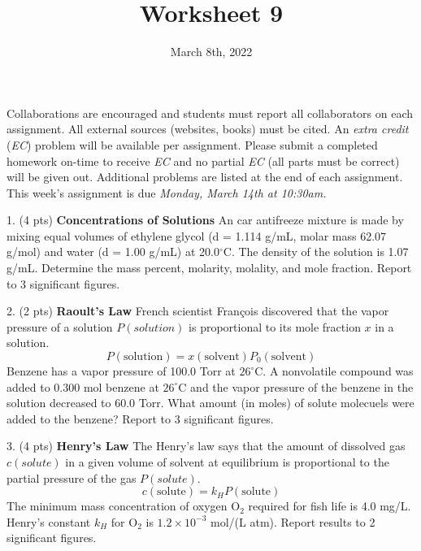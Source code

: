 \documentclass[11pt]{article}
\title{\textbf{Worksheet 9}}
\date{\vspace{-2em}March 8th, 2022}
\begin{document}
\maketitle

Collaborations are encouraged and students must report all collaborators
on each assignment. All external sources (websites, books) must be
cited. An \textit{extra credit} (\textit{EC}) problem will be available per
assignment. Please submit a completed homework on-time to receive \textit{EC}
and no partial \textit{EC} (all parts must be correct) will be given out.
Additional problems are listed at the end of each assignment. This week's
assignment is due \textit{Monday, March 14th at 10:30am.}

1. (4 pts) \textbf{Concentrations of Solutions} An car antifreeze mixture is made by mixing
equal volumes of ethylene glycol (d = 1.114 g/mL, molar mass 62.07 g/mol) and water
(d = 1.00 g/mL) at 20.0$^\circ$C. The density of the solution is 1.07 g/mL. Determine
the mass percent, molarity, molality, and mole fraction. Report to 3 significant figures.


\vspace{2in}

2. (2 pts) \textbf{Raoult's Law} French scientist Fran\c{c}ois discovered that the vapor pressure
of a solution $P(solution)$ is proportional to its mole fraction $x$ in a solution.
\begin{equation}
  P(\text{solution}) = x(\text{solvent})P_0(\text{solvent})
\end{equation}
Benzene has a vapor pressure of 100.0 Torr at $26^\circ$C. A nonvolatile compound was added
to 0.300 mol benzene at $26^\circ$C and the vapor pressure of the benzene in the solution
decreased to 60.0 Torr. What amount (in moles) of solute molecuels were added to the benzene?
Report to 3 significant figures.

\vspace{2in}

3. (4 pts) \textbf{Henry's Law} The Henry's law says that the amount of dissolved gas
$c(solute)$ in a given volume of solvent at equilibrium is proportional to the partial
pressure of the gas $P(solute)$. 
\begin{equation}
  c(\text{solute}) = k_HP(\text{solute})
\end{equation}
The minimum mass concentration of oxygen O$_2$ required for fish life is 4.0 mg/L.
Henry's constant $k_H$ for O$_2$ is $1.2\times 10^{-3}$ mol/(L atm). Report results to 2
significant figures.
\end{document}

